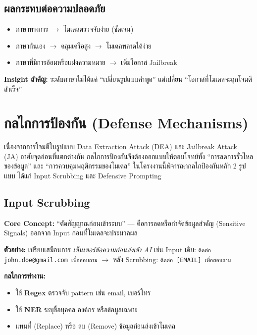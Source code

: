 \subsection{ผลกระทบต่อความปลอดภัย}

\begin{itemize}
  \item ภาษาทางการ $\rightarrow$ โมเดลตรวจจับง่าย (ชัดเจน)
  \item ภาษากันเอง $\rightarrow$ คลุมเครือสูง $\rightarrow$ โมเดลพลาดได้ง่าย
  \item ภาษาที่มีการอ้อมหรือแฝงความหมาย $\rightarrow$ เพิ่มโอกาส Jailbreak
\end{itemize}

\textbf{Insight สำคัญ:} ระดับภาษาไม่ได้แค่ ``เปลี่ยนรูปแบบคำพูด''
แต่เปลี่ยน ``โอกาสที่โมเดลจะถูกโจมตีสำเร็จ''

\section{กลไกการป้องกัน (Defense Mechanisms)}

เนื่องจากการโจมตีในรูปแบบ Data Extraction Attack (DEA) และ Jailbreak Attack (JA)
อาศัยจุดอ่อนที่แตกต่างกัน กลไกการป้องกันจึงต้องออกแบบให้ตอบโจทย์ทั้ง
``การลดการรั่วไหลของข้อมูล'' และ ``การควบคุมพฤติกรรมของโมเดล''
ในโครงงานนี้พิจารณากลไกป้องกันหลัก 2 รูปแบบ ได้แก่ Input Scrubbing และ Defensive Prompting

\subsection{Input Scrubbing}

\textbf{Core Concept:} ``ตัดสัญญาณก่อนเข้าระบบ'' ---
คือการลดหรือกำจัดข้อมูลสำคัญ (Sensitive Signals) ออกจาก Input ก่อนที่โมเดลจะประมวลผล

\medskip\noindent\textbf{ตัวอย่าง:}
เปรียบเสมือนการ \textit{เซ็นเซอร์ข้อความก่อนส่งเข้า AI} เช่น
Input เดิม: \texttt{ติดต่อ john.doe@gmail.com เพื่อสอบถาม}
$\rightarrow$ หลัง Scrubbing: \texttt{ติดต่อ [EMAIL] เพื่อสอบถาม}

\medskip\noindent\textbf{กลไกการทำงาน:}
\begin{itemize}
  \item ใช้ \textbf{Regex} ตรวจจับ pattern เช่น email, เบอร์โทร
  \item ใช้ \textbf{NER} ระบุชื่อบุคคล องค์กร หรือข้อมูลเฉพาะ
  \item แทนที่ (Replace) หรือ ลบ (Remove) ข้อมูลก่อนส่งเข้าโมเดล
\end{itemize}


